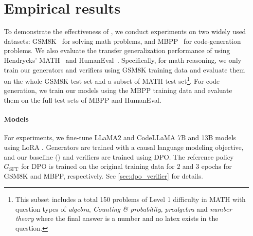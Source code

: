 

\section{Empirical results}

\label{sec:exp_desc}
To demonstrate the effectiveness of \vstar{}, we conduct experiments on two widely used datasets:
GSM8K~\citep{DBLP:journals/corr/abs-2110-14168} for solving math problems, and MBPP~\citep{austin2021program} for code-generation problems. We also evaluate the transfer generalization performance of \vstar{} using Hendrycks' MATH~\citep{DBLP:conf/nips/HendrycksBKABTS21} and HumanEval~\citep{chen2021codex}. Specifically, for math reasoning, we only train our generators and verifiers using GSM8K training data and evaluate them on the whole GSM8K test set and a subset of MATH test set\footnote{This subset includes a total 150 problems of Level 1 difficulty in MATH with question types of \textit{algebra}, \textit{Counting \& probability}, \textit{prealgebra} and \textit{number theory} where the final answer is a number and no latex exists in the question.}.
For code generation, we train our models using the MBPP training data and evaluate them on the full test sets of MBPP and HumanEval.


\paragraph{Models} For experiments, we fine-tune LLaMA2 \citep{DBLP:journals/corr/abs-2307-09288} and CodeLLaMA \citep{DBLP:journals/corr/abs-2308-12950} 7B and 13B models using LoRA \citep{DBLP:conf/iclr/HuSWALWWC22}. 
Generators are trained with a causal language modeling objective, and our baseline (\vstar [1 Iter]) and \vstar{} verifiers are trained using DPO. The reference policy $G_{\text{SFT}}$ for DPO is trained on the original training data for 2 and 3 epochs for GSM8K and MBPP, respectively. See \autoref{sec:dpo_verifier} for details. 

